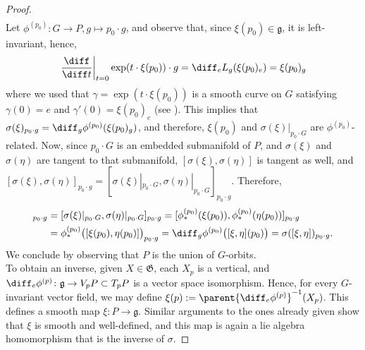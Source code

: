 \begin{proof}
\begin{align*}
    \end{align*}
    Let \(\phi^{(p_0)}\colon G \to P, g \mapsto p_0 \cdot g\), and observe that, since \(\xi(p_0)\in \mathfrak{g}\), it is left-invariant, hence,
    \[
    \left.\frac{\diff}{\diff t} \right|_{t=0} \exp(t \cdot \xi(p_0)) \cdot g = \diff_e L_g (\xi(p_0)_e)=\xi(p_0)_g
    \] 
    where we used that \(\gamma=\exp(t\cdot \xi(p_0))\) is a smooth curve on \(G\) satisfying \(\gamma(0)=e\) and \(\gamma'(0)=\xi(p_0)_e\) (see \parencite[Cor. 3.25]{lee_introSM}). This implies that \(\sigma(\xi)_{p_0 \cdot g}=\diff_g\phi^{(p_0)}(\xi(p_0)_g)\), and therefore, \(\xi(p_0)\) and \(\sigma(\xi)|_{p_0 \cdot G}\) are \(\phi^{(p_0)}\)-related. Now, since \(p_0\cdot G\) is an embedded submanifold of \(P\), and \(\sigma(\xi)\) and \(\sigma(\eta)\) are tangent to that submanifold, \([\sigma(\xi), \sigma(\eta)]\) is tangent as well, and \([\sigma(\xi), \sigma(\eta)]_{p_0 \cdot g} = [\sigma(\xi)|_{p_0 \cdot G}, \sigma(\eta)|_{p_0 \cdot G}]_{p_0\cdot g}\). Therefore,
    \begin{align*}
    [\sigma(\xi), \sigma(\eta)]_{p_0 \cdot g} &= [\sigma(\xi)|_{p_0 \cdot G}, \sigma(\eta)|_{p_0 \cdot G}]_{p_0\cdot g} =[\phi^{(p_0)}_*(\xi(p_0)), \phi^{(p_0)}_*(\eta(p_0))]_{p_0 \cdot g}  \\
    &= \phi^{(p_0)}_* \big([\xi(p_0), \eta(p_0)]\big)_{p_0 \cdot g}=\diff_{g}\phi^{(p_0)}\big([\xi, \eta](p_0)\big) = \sigma([\xi, \eta])_{p_0\cdot g}.
    \end{align*}
    We conclude by observing that \(P\) is the union of \(G\)-orbits. \\

    To obtain an inverse, given \(X \in \mathfrak{G}\), each \(X_p\) is a vertical, and \(\diff_e\phi^{(p)}\colon \mathfrak{g} \to V_pP \subset T_pP\) is a vector space isomorphism. Hence, for every \(G\)-invariant vector field, we may define \(\xi(p):=\parent{\diff_e\phi^{(p)}}^{-1}(X_p)\). This defines a smooth map \(\xi\colon P \to \mathfrak{g}\). Similar arguments to the ones already given show that \(\xi\) is smooth and well-defined, and this map is again a lie algebra homomorphism that is the inverse of \(\sigma\).
\end{proof}


